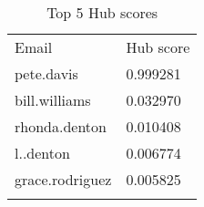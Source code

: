 \documentclass{tufte-handout}
\begin{document}
\begin{longtable}[c]{@{}ll@{}}
\toprule\addlinespace
\begin{minipage}[b]{0.24\columnwidth}\raggedright
Email
\end{minipage} & \begin{minipage}[b]{0.16\columnwidth}\raggedright
Hub score
\end{minipage}
\\\addlinespace
\midrule\endhead
\begin{minipage}[t]{0.24\columnwidth}\raggedright
pete.davis
\end{minipage} & \begin{minipage}[t]{0.16\columnwidth}\raggedright
0.999281
\end{minipage}
\\\addlinespace
\begin{minipage}[t]{0.24\columnwidth}\raggedright
bill.williams
\end{minipage} & \begin{minipage}[t]{0.16\columnwidth}\raggedright
0.032970
\end{minipage}
\\\addlinespace
\begin{minipage}[t]{0.24\columnwidth}\raggedright
rhonda.denton
\end{minipage} & \begin{minipage}[t]{0.16\columnwidth}\raggedright
0.010408
\end{minipage}
\\\addlinespace
\begin{minipage}[t]{0.24\columnwidth}\raggedright
l..denton
\end{minipage} & \begin{minipage}[t]{0.16\columnwidth}\raggedright
0.006774
\end{minipage}
\\\addlinespace
\begin{minipage}[t]{0.24\columnwidth}\raggedright
grace.rodriguez
\end{minipage} & \begin{minipage}[t]{0.16\columnwidth}\raggedright
0.005825
\end{minipage}
\\\addlinespace
\bottomrule
\addlinespace
\caption{Top 5 Hub scores}
\end{longtable}
\end{document}
